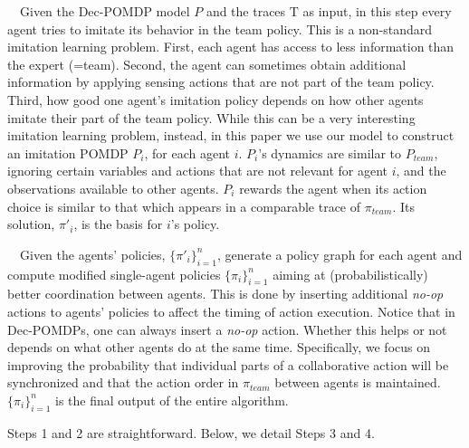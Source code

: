 \documentclass[runningheads]{llncs}
\newcommand{\Tau}{\mathrm{T}}
\begin{document}
\ \ Given the Dec-POMDP model $P$ and the traces $\Tau$ as input,  in this step every agent tries to  imitate its behavior in the team policy.
This is a non-standard imitation learning problem. First, each agent has access to less information than the expert (=team). Second, the agent can sometimes obtain additional information by applying sensing actions that are not part of the team policy. Third, how good one agent's imitation policy depends on how other agents imitate their part of the team policy. While this can be a very interesting imitation learning problem, instead, in this paper we use our model to construct an
imitation POMDP  $P_i$,
for each agent $i$. $P_i$'s dynamics are similar to $P_{team}$, ignoring certain variables and actions that are not relevant for agent $i$, and the observations available to other agents. $P_i$ rewards the agent when its action choice is similar to that which appears in a comparable trace of $\pi_{team}$. Its solution, $\pi'_i$, is the basis for $i$'s policy.


\ \ 
Given the agents' policies, $\{\pi'_i\}_{i=1}^{n}$, generate a policy
graph for each agent and compute modified single-agent policies $\{\pi_i\}_{i=1}^{n}$ aiming at (probabilistically) better coordination between agents.
This is done by inserting additional  {\em no-op} actions to  agents' policies to affect the timing of action execution.
Notice that in Dec-POMDPs, one can always insert a {\em no-op} action. Whether this helps or not depends on what other agents do at the same time. Specifically, we
focus on improving the probability that individual parts of a collaborative action will be synchronized and that the action order in $\pi_{team}$ between agents is maintained.  $\{\pi_{i}\}_{i=1}^n$ is the final output of the entire algorithm.

Steps 1 and 2 are  straightforward. Below, we detail Steps 3 and 4. 
\end{document}
